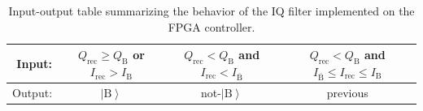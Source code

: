 \documentclass[
	 			preprint,     		superscriptaddress, 																longbibliography,
		amsmath, amssymb,
		aps,  prb,   		floatfix,
		linenumbers     
	]{revtex4-1}
\newcommand{\ket}[1]{\left|#1\right>}
\begin{document}
\begin{table}[!h]
\begin{center}
	\begin{tabular}{r|c|c|c}
	Input: & $Q_{\mathrm{rec}}\geq Q_{\mathrm{B}}$ or $I_{\mathrm{rec}}> I_{\mathrm{B}}$ & $Q_{\mathrm{rec}}<Q_{\mathrm{B}}$ and $I_{\mathrm{rec}}<I_{\bar{\mathrm{B}}}$ & $Q_{\mathrm{rec}}<Q_{\mathrm{B}}$ and $I_{\bar{\mathrm{B}}}\leq I_{\mathrm{rec}} \leq I_{\mathrm{B}}$\tabularnewline
	\hline 
	Output: & $\ket{\mathrm{B}}$ & not-$\ket{\mathrm{B}}$ & previous\tabularnewline
	\end{tabular}
	\caption{\label{table:iq-filter-logic} Input-output table summarizing the behavior  of the IQ filter implemented on the FPGA controller.	}
\end{center}
\end{table}
\end{document}
